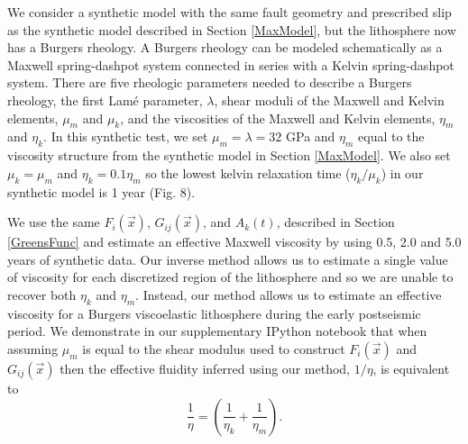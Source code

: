 We consider a synthetic model with the same fault geometry and
prescribed slip as the synthetic model described in Section \ref{MaxModel}, but
the lithosphere now has a Burgers rheology.  A Burgers rheology can be
modeled schematically as a Maxwell spring-dashpot system connected in
series with a Kelvin spring-dashpot system. There are five rheologic
parameters needed to describe a Burgers rheology, the first Lam\'e
parameter, $\lambda$, shear moduli of the Maxwell and Kelvin elements,
$\mu_m$ and $\mu_k$, and the viscosities of the Maxwell and Kelvin
elements, $\eta_m$ and $\eta_k$.  In this synthetic test, we set
$\mu_m=\lambda=32$ GPa and $\eta_m$ equal to the viscosity structure
from the synthetic model in Section \ref{MaxModel}.  We also set $\mu_k=\mu_m$
and $\eta_k=0.1\eta_m$ so the lowest kelvin relaxation time
($\eta_k/\mu_k$) in our synthetic model is 1 year (Fig. 8).

We use the same $F_i(\vec{x})$, $G_{ij}(\vec{x})$, and $A_k(t)$,
described in Section \ref{GreensFunc} and estimate an effective
Maxwell viscosity by using 0.5, 2.0 and 5.0 years of synthetic data.
Our inverse method allows us to estimate a single value of viscosity
for each discretized region of the lithosphere and so we are unable to
recover both $\eta_k$ and $\eta_m$.  Instead, our method allows us to
estimate an effective viscosity for a Burgers viscoelastic lithosphere
during the early postseismic period.  We demonstrate in our
supplementary IPython notebook that when assuming $\mu_m$ is equal to
the shear modulus used to construct $F_i(\vec{x})$ and
$G_{ij}(\vec{x})$ then the effective fluidity inferred using our
method, $1/\eta$, is equivalent to
\begin{equation}\label{EquivalentBurgers}
\frac{1}{\eta} = \left(\frac{1}{\eta_k} + \frac{1}{\eta_m}\right).
\end{equation}

